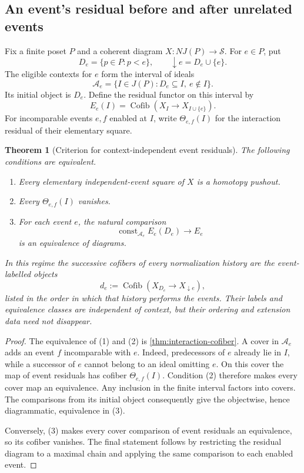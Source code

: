 \documentclass[11pt]{article}
\newtheorem{theorem}{Theorem}[section]
\theoremstyle{definition}
\theoremstyle{remark}
\newcommand{\Cofib}{\operatorname{Cofib}}
\begin{document}
\subsection{An event's residual before and after unrelated events}

Fix a finite poset $P$ and a coherent diagram $X:NJ(P)\to\mathcal S$. For $e\in P$, put
\[
 D_e=\{p\in P:p<e\},\qquad
 \downarrow e=D_e\cup\{e\}.
\]
The eligible contexts for $e$ form the interval of ideals
\[
 \mathcal A_e=\{I\in J(P):D_e\subseteq I,\ e\notin I\}.
\]
Its initial object is $D_e$. Define the residual functor on this interval by
\[
 E_e(I)=\Cofib(X_I\to X_{I\cup\{e\}}).
\]
For incomparable events $e,f$ enabled at $I$, write $\Theta_{e,f}(I)$ for the interaction residual of their elementary square.

\begin{theorem}[Criterion for context-independent event residuals]\label{thm:event-context-invariance}
The following conditions are equivalent.
\begin{enumerate}
\item Every elementary independent-event square of $X$ is a homotopy pushout.
\item Every $\Theta_{e,f}(I)$ vanishes.
\item For each event $e$, the natural comparison
\[
 \operatorname{const}_{\mathcal A_e}E_e(D_e)\longrightarrow E_e
\]
is an equivalence of diagrams.
\end{enumerate}
In this regime the successive cofibers of every normalization history are the event-labelled objects
\[
 d_e:=\Cofib(X_{D_e}\to X_{\downarrow e}),
\]
listed in the order in which that history performs the events. Their labels and equivalence classes are independent of context, but their ordering and extension data need not disappear.
\end{theorem}

\begin{proof}
The equivalence of (1) and (2) is \cref{thm:interaction-cofiber}. A cover in $\mathcal A_e$ adds an event $f$ incomparable with $e$. Indeed, predecessors of $e$ already lie in $I$, while a successor of $e$ cannot belong to an ideal omitting $e$. On this cover the map of event residuals has cofiber $\Theta_{e,f}(I)$. Condition (2) therefore makes every cover map an equivalence. Any inclusion in the finite interval factors into covers. The comparisons from its initial object consequently give the objectwise, hence diagrammatic, equivalence in (3).

Conversely, (3) makes every cover comparison of event residuals an equivalence, so its cofiber vanishes. The final statement follows by restricting the residual diagram to a maximal chain and applying the same comparison to each enabled event.
\end{proof}
\end{document}
